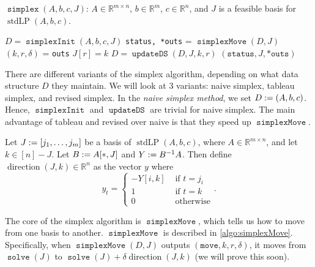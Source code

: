 \documentclass[a4paper, 12pt, fleqn]{article}
\DeclareMathOperator{\stdLP}{stdLP}
\DeclareMathOperator{\direction}{direction}
\DeclareMathOperator{\solve}{\mathtt{solve}}
\DeclareMathOperator{\simplex}{\mathtt{simplex}}
\DeclareMathOperator{\simplexInit}{\mathtt{simplexInit}}
\DeclareMathOperator{\simplexMove}{\mathtt{simplexMove}}
\DeclareMathOperator{\updateDS}{\mathtt{updateDS}}
\begin{document}
\begin{algorithm}[H]
\caption{$\simplex(A, b, c, J)$:
$A \in \mathbb{R}^{m \times n}$, $b \in \mathbb{R}^m$, $c \in \mathbb{R}^n$,
and $J$ is a feasible basis for $\stdLP(A, b, c)$.
}
\begin{algorithmic}[1]
\State $D = \simplexInit(A, b, c, J)$
    \State \texttt{status, *outs} = $\simplexMove(D, J)$
        \State $(k, r, \delta)$ = \texttt{outs}
        \State\label{alg-line:simplex:J}$J[r] = k$
        \State $D = \updateDS(D, J, k, r)$
    \Else
        \State \Return $(\texttt{status}, J, \texttt{*outs})$
    \EndIf
\EndWhile
\end{algorithmic}
\label{algo:simplex}
\end{algorithm}

There are different variants of the simplex algorithm, depending on what
data structure $D$ they maintain.
We will look at 3 variants: naive simplex, tableau simplex, and revised simplex.
In the \emph{naive simplex method}, we set $D := (A, b, c)$.
Hence, $\simplexInit$ and $\updateDS$ are trivial for naive simplex.
The main advantage of tableau and revised over naive is that they speed up $\simplexMove$.

\begin{definition}
Let $J := [j_1, \ldots, j_m]$ be a basis of $\stdLP(A, b, c)$,
where $A \in \mathbb{R}^{m \times n}$, and let $k \in [n] - J$.
Let $B := A[*,J]$ and $Y := B^{-1}A$.
Then define $\direction(J, k) \in \mathbb{R}^n$ as the vector $y$ where
\[ y_t = \begin{cases}
    -Y[i, k] & \textrm{ if } t = j_i
    \\ 1 & \textrm{ if } t = k
    \\ 0 & \textrm{ otherwise}
    \end{cases}. \]
\end{definition}

The core of the simplex algorithm is $\simplexMove$,
which tells us how to move from one basis to another.
$\simplexMove$ is described in \cref{algo:simplexMove}.
Specifically, when $\simplexMove(D, J)$ outputs $(\mathtt{move}, k, r, \delta)$,
it moves from $\solve(J)$ to $\solve(J) + \delta\direction(J, k)$ (we will prove this soon).
\end{document}

